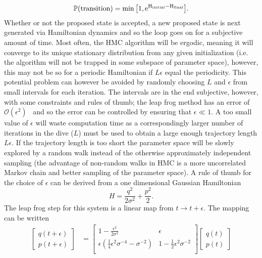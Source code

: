 \begin{equation}
	\mathbb{P}(\rm transition)=\min\big[1,e^{H_{initial}-H_{final}}\big].
	\label{pro}
\end{equation}
Whether or not the proposed state is accepted, a new proposed state is next generated via Hamiltonian dynamics and so the loop goes on for a subjective amount of time. \newline
Most often, the HMC algorithm will be ergodic, meaning it will converge to its unique stationary distribution from any given initialization (i.e. the algorithm will not be trapped in some subspace of parameter space), however, this may not be so for a periodic Hamiltonian if $L\epsilon$ equal the periodicity. This potential problem can however be avoided by randomly choosing $L$ and $\epsilon$ from small intervals for each iteration. The intervals are in the end subjective, however, with some constraints and rules of thumb; the leap frog method has an error of $\mathcal{O}(\epsilon^2)$~\citep{Neal:1996} and so the error can be controlled by ensuring that $\epsilon\ll1$. A too small value of $\epsilon$ will waste computation time as a correspondingly larger number of iterations in the dive ($L$) must be used to obtain a large enough trajectory length $L\epsilon$. If the trajectory length is too short the parameter space will be slowly explored by a random walk instead of the otherwise approximately independent sampling (the advantage of non-random walks in HMC is a more uncorrelated Markov chain and better sampling of the parameter space). A rule of thumb for the choice of $\epsilon$ can be derived from a one dimensional Gaussian Hamiltonian
\begin{equation}
	H=\frac{q^2}{2\sigma^2}+\frac{p^2}{2}.
	\label{ghf}
\end{equation}
The leap frog step for this system is a linear map from $t\rightarrow t+\epsilon$. The mapping can be written
\begin{equation}
	\begin{split}
		\begin{bmatrix}
			q(t+\epsilon)\\
			p(t+\epsilon)
		\end{bmatrix}&=\begin{bmatrix}
			1-\frac{\epsilon^2}{2\sigma^2}& \epsilon\\
			\epsilon(\frac{1}{4}\epsilon^2\sigma^{-4}-\sigma^{-2}) & 1-\frac{1}{2}\epsilon^2\sigma^{-2}\\
		\end{bmatrix}\begin{bmatrix}
			q(t)\\
			p(t)
		\end{bmatrix}\\
	\end{split}
\end{equation}
